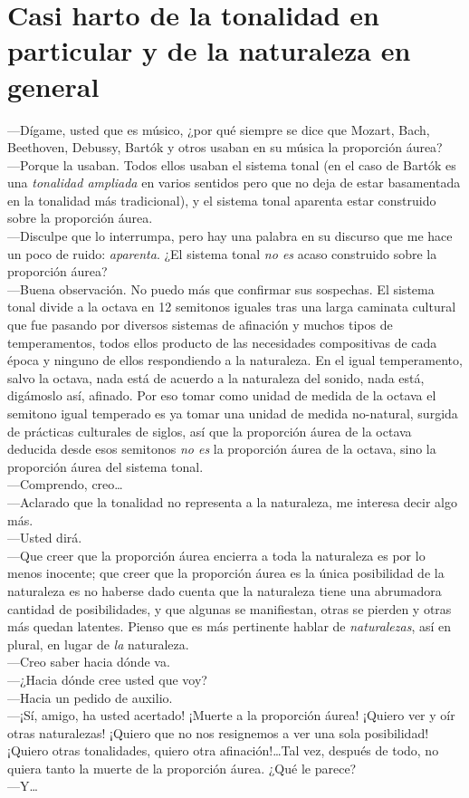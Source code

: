 \section{Casi harto de la tonalidad en particular y de la naturaleza en general}
---Dígame, usted que es músico, ¿por qué siempre se dice que Mozart, Bach, Beethoven, Debussy, Bartók y otros usaban en su música la proporción áurea?\\
---Porque la usaban. Todos ellos usaban el sistema tonal (en el caso de Bartók es una \emph{tonalidad ampliada} en varios sentidos pero que no deja de estar basamentada en la tonalidad más tradicional), y el sistema tonal aparenta estar construido sobre la proporción áurea.\\
---Disculpe que lo interrumpa, pero hay una palabra en su discurso que me hace un poco de ruido: \emph{aparenta}. ¿El sistema tonal \emph{no es} acaso construido sobre la proporción áurea?\\
---Buena observación. No puedo más que confirmar sus sospechas. El sistema tonal divide a la octava en 12 semitonos iguales tras una larga caminata cultural que fue pasando por diversos sistemas de afinación y muchos tipos de temperamentos, todos ellos producto de las necesidades compositivas de cada época y ninguno de ellos respondiendo a la naturaleza. En el igual temperamento, salvo la octava, nada está de acuerdo a la naturaleza del sonido, nada está, digámoslo así, afinado. Por eso tomar como unidad de medida de la octava el semitono igual temperado es ya tomar una unidad de medida no-natural, surgida de prácticas culturales de siglos, así que la proporción áurea de la octava deducida desde esos semitonos \emph{no es} la proporción áurea de la octava, sino la proporción áurea del sistema tonal.\\
---Comprendo, creo\ldots\\
---Aclarado que la tonalidad no representa a la naturaleza, me interesa decir algo más.\\
---Usted dirá.\\
---Que creer que la proporción áurea encierra a toda la naturaleza es por lo menos inocente; que creer que la proporción áurea es la única posibilidad de la naturaleza es no haberse dado cuenta que la naturaleza tiene una abrumadora cantidad de posibilidades, y que algunas se manifiestan, otras se pierden y otras más quedan latentes. Pienso que es más pertinente hablar de \emph{naturalezas}, así en plural, en lugar de \emph{la} naturaleza.\\
---Creo saber hacia dónde va.\\
---¿Hacia dónde cree usted que voy?\\
---Hacia un pedido de auxilio.\\
---¡Sí, amigo, ha usted acertado! ¡Muerte a la proporción áurea! ¡Quiero ver y oír otras naturalezas! ¡Quiero que no nos resignemos a ver una sola posibilidad! ¡Quiero otras tonalidades, quiero otra afinación!\ldots Tal vez, después de todo, no quiera tanto la muerte de la proporción áurea. ¿Qué le parece?\\
---Y\ldots
